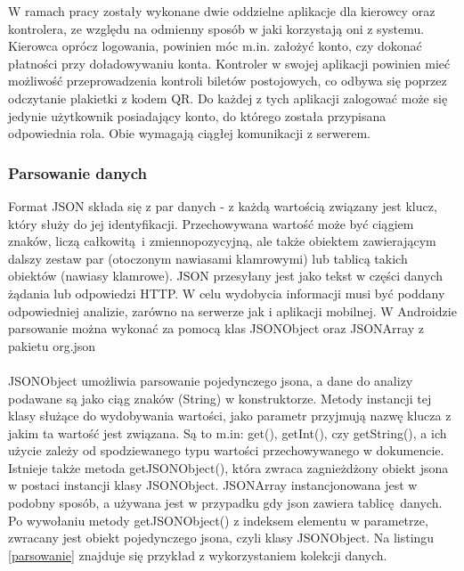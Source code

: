 W ramach pracy zostały wykonane dwie oddzielne aplikacje dla kierowcy oraz kontrolera, ze względu na odmienny sposób w jaki korzystają oni z systemu. Kierowca oprócz logowania, powinien móc m.in. założyć konto, czy dokonać płatności przy doładowywaniu konta. Kontroler w swojej aplikacji powinien mieć możliwość przeprowadzenia kontroli biletów postojowych, co odbywa się poprzez odczytanie plakietki z kodem QR. Do każdej z tych aplikacji zalogować może się jedynie użytkownik posiadający konto, do którego została przypisana odpowiednia rola. Obie wymagają ciągłej komunikacji z serwerem.

\subsubsection*{Parsowanie danych}

Format JSON składa się z par danych - z każdą wartością związany jest klucz, który służy do jej identyfikacji. Przechowywana wartość może być ciągiem znaków, liczą całkowitą i zmiennopozycyjną, ale także obiektem zawierającym dalszy zestaw par (otoczonym nawiasami klamrowymi) lub tablicą takich obiektów (nawiasy klamrowe). JSON przesyłany jest jako tekst w części danych żądania lub odpowiedzi HTTP. W celu wydobycia informacji musi być poddany odpowiedniej analizie, zarówno na serwerze jak i aplikacji mobilnej. W Androidzie parsowanie można wykonać za pomocą klas JSONObject oraz JSONArray z pakietu org.json 
\\
\\
JSONObject umożliwia parsowanie pojedynczego jsona, a dane do analizy podawane są jako ciąg znaków (String) w konstruktorze. Metody instancji tej klasy służące do wydobywania wartości, jako parametr przyjmują nazwę klucza z jakim ta wartość jest związana. Są to m.in: get(), getInt(), czy getString(), a ich użycie zależy od spodziewanego typu wartości przechowywanego w dokumencie. Istnieje także metoda getJSONObject(), która zwraca zagnieżdżony obiekt jsona w postaci instancji klasy JSONObject. JSONArray instancjonowana jest w podobny sposób, a używana jest w przypadku gdy json zawiera tablicę danych. Po wywołaniu metody getJSONObject() z indeksem elementu w parametrze, zwracany jest obiekt pojedynczego jsona, czyli klasy JSONObject. Na listingu \ref{parsowanie} znajduje się przykład z wykorzystaniem kolekcji danych.

\begin{singlespace}
	\label{parsowanie}
	\vspace{0.3cm}
	\inputminted[fontsize=\footnotesize, linenos=true]{java}{src/imp/parsowanie-json.java}
\end{singlespace}

